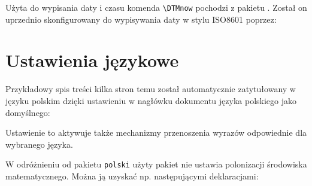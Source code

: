 \documentclass[fontSize=10pt,extra]{pdfArticle}
\begin{document}
\putExampleTeX

\putExampleVerbatimAdjust

Użyta do wypisania daty i czasu komenda \Verb$\DTMnow$ pochodzi z pakietu .
Został on uprzednio skonfigurowany do wypisywania daty w stylu ISO8601 poprzez:

\putExampleVerbatimAdjust[1]

\section{Ustawienia językowe}

Przykładowy spis treści kilka stron temu został automatycznie zatytułowany w języku polskim dzięki ustawieniu w nagłówku dokumentu języka polskiego jako domyślnego:

\begin{MintedCode}
\RequirePackage{polyglossia}
\setdefaultlanguage{polish} %
\end{MintedCode}

Ustawienie to aktywuje także mechanizmy przenoszenia wyrazów odpowiednie dla wybranego języka.

W odróżnieniu od pakietu \texttt{polski} użyty pakiet  nie ustawia polonizacji środowiska matematycznego. Można ją uzyskać np. następującymi deklaracjami:

\begin{MintedCode}
\newcommand{\tg}{\ensuremath{\operatorfont tg}}
\newcommand{\ctg}{\ensuremath{\operatorfont ctg}}
\newcommand{\arctg}{\ensuremath{\operatorfont arctg}}
\newcommand{\arcctg}{\ensuremath{\operatorfont arcctg}}
\newcommand{\tgh}{\ensuremath{\operatorfont tgh}}
\newcommand{\ctgh}{\ensuremath{\operatorfont ctgh}}
\newcommand{\nwd}{\ensuremath{\operatorfont nwd}}
\AtBeginDocument{\let\le=\leqslant \let\ge=\geqslant}
\end{MintedCode}
\end{document}
